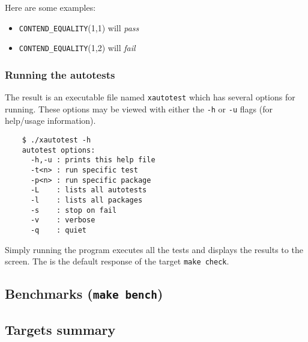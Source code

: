\documentclass[11pt,twoside]{report}
\begin{document}
Here are some examples:
\begin{itemize}
\item[] {\tt CONTEND\_EQUALITY}(1,1) will {\it pass}
\item[] {\tt CONTEND\_EQUALITY}(1,2) will {\it fail}
\end{itemize}

\subsubsection{Running the autotests}
The result is an executable file named {\tt xautotest} which has several
options for running.
These options may be viewed with either the {\tt -h} or {\tt -u} flags (for
help/usage information).
\begin{verbatim}
    $ ./xautotest -h
    autotest options:
      -h,-u : prints this help file
      -t<n> : run specific test
      -p<n> : run specific package
      -L    : lists all autotests
      -l    : lists all packages
      -s    : stop on fail
      -v    : verbose
      -q    : quiet
\end{verbatim}
Simply running the program executes all the tests and displays the results to
the screen.
The is the default response of the target {\tt make check}.

\subsection{Benchmarks ({\tt make bench})}
\label{ch:installation:targets:benchmarks}

\subsection{Targets summary}



%
%
\cleardoublepage
%


\appendix
%
%
\end{document}

